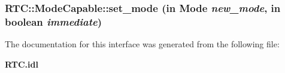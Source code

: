 \subsubsection{ RTC::Mode\-Capable::set\_\-mode (in {\bf Mode} {\em new\_\-mode}, in boolean {\em immediate})}\label{interfaceRTC_1_1ModeCapable_RTC_1_1MultiModeObjecta5}




The documentation for this interface was generated from the following file:\begin{CompactItemize}
\item 
{\bf RTC.idl}\end{CompactItemize}

